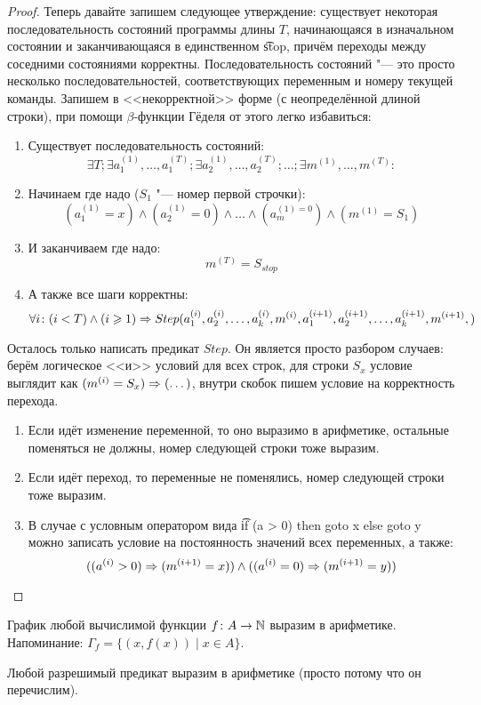 \begin{proof}
	Теперь давайте запишем следующее утверждение: существует некоторая последовательность
	состояний программы длины $T$, начинающаяся в изначальном состоянии и заканчивающаяся в единственном
	\t{stop}, причём переходы между соседними состояниями корректны.
	Последовательность состояний "--- это просто несколько последовательностей, соответствующих переменным
	и номеру текущей команды.
	Запишем в <<некорректной>> форме (с неопределённой длиной строки), при помощи $\beta$-функции Гёделя от этого легко избавиться:
	\begin{enumerate}
		\item Существует последовательность состояний:
			\[
			\exists T;
			\exists a_1^{(1)}, \dots, a_1^{(T)};
			\exists a_2^{(1)}, \dots, a_2^{(T)};
			\dots;
			\exists m^{(1)}, \dots, m^{(T)}
			\colon
			\]
		\item Начинаем где надо ($S_1$ "--- номер первой строчки):
			\[
			(a_1^{(1)} = x) \land (a_2^{(1)} = 0) \land \dots \land (a_m^{(1) = 0}) \land (m^{(1)} = S_1)
			\]
		\item И заканчиваем где надо:
			\[
			m^{(T)}=S_{stop}
			\]
		\item А также все шаги корректны:
			\[
			\forall i \colon (i < T) \land (i \geqslant 1) \Rightarrow Step(
			a_1^{(i)}, a_2^{(i)}, \dots, a_k^{(i)}, m^{(i)},
			a_1^{(i+1)}, a_2^{(i+1)}, \dots, a_k^{(i+1)}, m^{(i+1)},
			)
			\]
	\end{enumerate}
	Осталось только написать предикат $Step$.
	Он является просто разбором случаев: берём логическое <<и>> условий для всех строк,
	для строки $S_x$ условие выглядит как $(m^{(i)} = S_x) \Rightarrow (\dots)$, внутри скобок
	пишем условие на корректность перехода.
	\begin{enumerate}
		\item Если идёт изменение переменной, то оно выразимо в арифметике, остальные поменяться не должны,
			номер следующей строки тоже выразим.
		\item Если идёт переход, то переменные не поменялись, номер следующей строки тоже выразим.
		\item В случае с условным оператором вида \t{if (a > 0) then goto x else goto y} можно записать условие на постоянность значений всех переменных, а также:
			\[ ((a^{(i)} > 0) \Rightarrow (m^{(i+1)} = x)) \land ((a^{(i)} = 0) \Rightarrow (m^{(i+1)} = y)) \]
	\end{enumerate}
\end{proof}

\begin{conseq}
	График любой вычислимой функции $f \colon A \to \mathbb{N}$ выразим в арифметике.
	Напоминание: $\Gamma_f = \{ (x, f(x)) \mid x \in A \}$.
\end{conseq}
\begin{conseq}
	Любой разрешимый предикат выразим в арифметике (просто потому что он перечислим).
\end{conseq}

